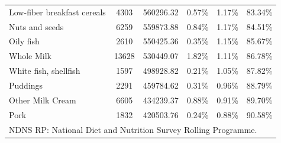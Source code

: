 \documentclass[utf8]{frontiersSCNS}
\begin{document}
\begin{table}[h!]
{\begin{tabular}{lccccc}
        Low-fiber breakfast cereals                         & 4303  & 560296.32  & 0.57\%        & 1.17\%   & 83.34\%      \\
        Nuts and seeds                                      & 6259  & 559873.88  & 0.84\%        & 1.17\%   & 84.51\%      \\
        Oily fish                                           & 2610  & 550425.36  & 0.35\%        & 1.15\%   & 85.67\%      \\
        Whole Milk                                          & 13628 & 530449.07  & 1.82\%        & 1.11\%   & 86.78\%      \\
        White fish, shellfish                               & 1597  & 498928.82  & 0.21\%        & 1.05\%   & 87.82\%      \\
        Puddings                                            & 2291  & 459784.62  & 0.31\%        & 0.96\%   & 88.79\%      \\
        Other Milk Cream                                    & 6605  & 434239.37  & 0.88\%        & 0.91\%   & 89.70\%      \\
        Pork                                                & 1832  & 420503.76  & 0.24\%        & 0.88\%   & 90.58\%     \\\hline
        \multicolumn{6}{l}{NDNS RP: National Diet and Nutrition Survey Rolling Programme. }
    \end{tabular}
        }
\end{table}
\end{document}
